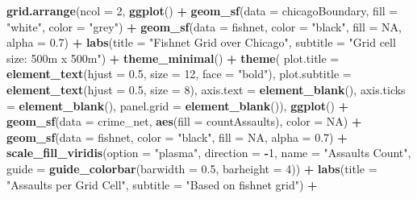 \documentclass[
]{article}
\newenvironment{Shaded}{\begin{snugshade}}{\end{snugshade}}
\newcommand{\AttributeTok}[1]{\textcolor[rgb]{0.13,0.29,0.53}{#1}}
\newcommand{\ConstantTok}[1]{\textcolor[rgb]{0.56,0.35,0.01}{#1}}
\newcommand{\DecValTok}[1]{\textcolor[rgb]{0.00,0.00,0.81}{#1}}
\newcommand{\FloatTok}[1]{\textcolor[rgb]{0.00,0.00,0.81}{#1}}
\newcommand{\FunctionTok}[1]{\textcolor[rgb]{0.13,0.29,0.53}{\textbf{#1}}}
\newcommand{\NormalTok}[1]{#1}
\newcommand{\SpecialCharTok}[1]{\textcolor[rgb]{0.81,0.36,0.00}{\textbf{#1}}}
\newcommand{\StringTok}[1]{\textcolor[rgb]{0.31,0.60,0.02}{#1}}
\begin{document}
\begin{Shaded}
\begin{Highlighting}[]
\FunctionTok{grid.arrange}\NormalTok{(}\AttributeTok{ncol =} \DecValTok{2}\NormalTok{,}
\FunctionTok{ggplot}\NormalTok{() }\SpecialCharTok{+}
  \FunctionTok{geom\_sf}\NormalTok{(}\AttributeTok{data =}\NormalTok{ chicagoBoundary, }\AttributeTok{fill =} \StringTok{"white"}\NormalTok{, }\AttributeTok{color =} \StringTok{"grey"}\NormalTok{) }\SpecialCharTok{+}
  \FunctionTok{geom\_sf}\NormalTok{(}\AttributeTok{data =}\NormalTok{ fishnet, }\AttributeTok{color =} \StringTok{"black"}\NormalTok{, }\AttributeTok{fill =} \ConstantTok{NA}\NormalTok{, }\AttributeTok{alpha =} \FloatTok{0.7}\NormalTok{) }\SpecialCharTok{+}
  \FunctionTok{labs}\NormalTok{(}\AttributeTok{title =} \StringTok{"Fishnet Grid over Chicago"}\NormalTok{,}
       \AttributeTok{subtitle =} \StringTok{"Grid cell size: 500m x 500m"}\NormalTok{) }\SpecialCharTok{+}
  \FunctionTok{theme\_minimal}\NormalTok{() }\SpecialCharTok{+}
  \FunctionTok{theme}\NormalTok{(}
    \AttributeTok{plot.title =} \FunctionTok{element\_text}\NormalTok{(}\AttributeTok{hjust =} \FloatTok{0.5}\NormalTok{, }\AttributeTok{size =} \DecValTok{12}\NormalTok{, }\AttributeTok{face =} \StringTok{"bold"}\NormalTok{),}
    \AttributeTok{plot.subtitle =} \FunctionTok{element\_text}\NormalTok{(}\AttributeTok{hjust =} \FloatTok{0.5}\NormalTok{, }\AttributeTok{size =} \DecValTok{8}\NormalTok{),}
    \AttributeTok{axis.text =} \FunctionTok{element\_blank}\NormalTok{(),}
    \AttributeTok{axis.ticks =} \FunctionTok{element\_blank}\NormalTok{(),}
    \AttributeTok{panel.grid =} \FunctionTok{element\_blank}\NormalTok{()),}
\FunctionTok{ggplot}\NormalTok{() }\SpecialCharTok{+}
  \FunctionTok{geom\_sf}\NormalTok{(}\AttributeTok{data =}\NormalTok{ crime\_net, }\FunctionTok{aes}\NormalTok{(}\AttributeTok{fill =}\NormalTok{ countAssaults), }\AttributeTok{color =} \ConstantTok{NA}\NormalTok{) }\SpecialCharTok{+}
  \FunctionTok{geom\_sf}\NormalTok{(}\AttributeTok{data =}\NormalTok{ fishnet, }\AttributeTok{color =} \StringTok{"black"}\NormalTok{, }\AttributeTok{fill =} \ConstantTok{NA}\NormalTok{, }\AttributeTok{alpha =} \FloatTok{0.7}\NormalTok{) }\SpecialCharTok{+}
  \FunctionTok{scale\_fill\_viridis}\NormalTok{(}\AttributeTok{option =} \StringTok{"plasma"}\NormalTok{, }\AttributeTok{direction =} \SpecialCharTok{{-}}\DecValTok{1}\NormalTok{, }\AttributeTok{name =} \StringTok{"Assaults Count"}\NormalTok{, }
                     \AttributeTok{guide =} \FunctionTok{guide\_colorbar}\NormalTok{(}\AttributeTok{barwidth =} \FloatTok{0.5}\NormalTok{, }\AttributeTok{barheight =} \DecValTok{4}\NormalTok{)) }\SpecialCharTok{+} 
  \FunctionTok{labs}\NormalTok{(}\AttributeTok{title =} \StringTok{"Assaults per Grid Cell"}\NormalTok{, }\AttributeTok{subtitle =} \StringTok{"Based on fishnet grid"}\NormalTok{) }\SpecialCharTok{+}

\end{Highlighting}
\end{Shaded}
\end{document}
